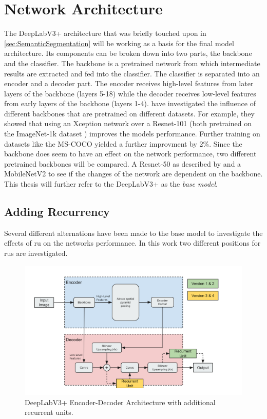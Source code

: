 \documentclass[11pt,
  paper=a4, 
  bibliography=totocnumbered,
	captions=tableheading,
	BCOR=10mm
]{scrreprt}
\theoremstyle{definition}
\def \figwidth {0.9\linewidth}
\begin{document}
\section{Network Architecture} \label{sec:Architecture}
The DeepLabV3+ architecture that was briefly touched upon in \ref{sec:SemanticSegmentation} will be working as a basis for the final model architecture.
Its components can be broken down into two parts, the backbone and the classifier.
The backbone is a pretrained network from which intermediate results are extracted and fed into the classifier.
The classifier is separated into an encoder and a decoder part.
The encoder receives high-level features from later layers of the backbone (layers 5-18) while the decoder receives low-level features from early layers of the backbone (layers 1-4).
\textcite{Chen2018b} have investigated the influence of different backbones that are pretrained on different datasets.
For example, they showed that using an Xception network \cite{Chollet2017} over a Resnet-101 \cite{He2016} (both pretrained on the ImageNet-1k dataset \cite{Russakovsky2015}) improves the models performance.
Further training on datasets like the MS-COCO \cite{Lin2014} yielded a further improvment by 2\%.
Since the backbone does seem to have an effect on the network performance, two different pretrained backbones will be compared.
A Resnet-50 as described by \textcite{He2016} and a MobileNetV2 \cite{Sandler2018} to see if the changes of the network are dependent on the backbone.
This thesis will further refer to the DeepLabV3+ as the \textit{base model}.

\subsection{Adding Recurrency} \label{sec:AddingRecurrency}
Several different alternations have been made to the base model to investigate the effects of \gls{ru} on the networks performance.
In this work two different positions for \glspl{ru} are investigated.

\begin{figure}[H]
	\centering
	\includegraphics[width=\figwidth]{DLV3Plus_RU}
	\caption[DeepLabV3+ Architecture with Reccurent Units]{
		DeepLabV3+ Encoder-Decoder Architecture with additional recurrent units.
		\label{fig:DLPlus}}
\end{figure}
\end{document}
